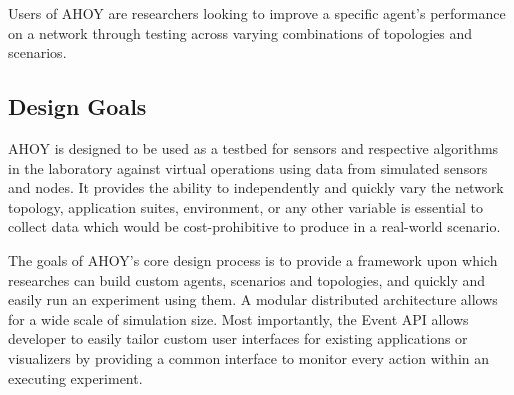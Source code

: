\documentclass[titlepage]{article}
\begin{document}
Users of AHOY are researchers looking to improve a specific agent's performance on a network through testing across varying combinations of topologies and scenarios.

\subsection{Design Goals}
AHOY is designed to be used as a testbed for sensors and respective algorithms in the laboratory against virtual operations using data from simulated sensors and nodes. It provides the ability to independently and quickly vary the network topology, application suites, environment, or any other variable is essential to collect data which would be cost-prohibitive to produce in a real-world scenario. 

The goals of AHOY's core design process is to provide a framework upon which researches can build custom agents, scenarios and topologies, and quickly and easily run an experiment using them. A modular distributed architecture allows for a wide scale of simulation size. Most importantly, the Event API allows developer to easily tailor custom user interfaces for existing applications or visualizers by providing a common interface to monitor every action within an executing experiment.
\end{document}
